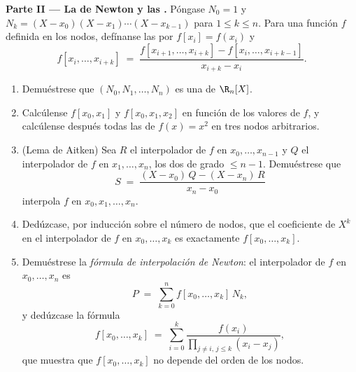 \begin{problem}
\medskip
\noindent\textbf{Parte II --- La  de Newton y las .} Póngase $N_0 = 1$ y
$N_k = (X - x_0)(X - x_1) \cdots (X - x_{k-1})$ para
$1 \leq k \leq n$. Para una función $f$ definida en los nodos,
defínanse las \emph{} por $f[x_i] = f(x_i)$ y
\[
f[x_i, \dots, x_{i+k}] \;=\;
\frac{f[x_{i+1}, \dots, x_{i+k}] - f[x_i, \dots, x_{i+k-1}]}
{x_{i+k} - x_i} .
\]
\begin{enumerate}[resume]
  \item Demuéstrese que $(N_0, N_1, \dots, N_n)$ es una  de
        $\R_n[X]$.
  \item Calcúlense $f[x_0, x_1]$ y $f[x_0, x_1, x_2]$ en función de
        los valores de $f$, y calcúlense después todas las
         de $f(x) = x^2$ en tres nodos
        arbitrarios.
  \item (Lema de Aitken) Sea $R$ el interpolador de $f$ en
        $x_0, \dots, x_{n-1}$ y $Q$ el interpolador de $f$ en
        $x_1, \dots, x_n$, los dos de grado $\leq n - 1$. Demuéstrese que
        \[
        S \;=\; \frac{(X - x_0)\,Q - (X - x_n)\,R}{x_n - x_0}
        \]
        interpola $f$ en $x_0, x_1, \dots, x_n$.
  \item Dedúzcase, por inducción sobre el número de nodos, que el
        coeficiente de $X^{k}$ en el interpolador de $f$ en
        $x_0, \dots, x_k$ es exactamente $f[x_0, \dots, x_k]$.
  \item Demuéstrese la \emph{fórmula de interpolación de Newton}: el
        interpolador de $f$ en $x_0, \dots, x_n$ es
        \[
        P \;=\; \sum_{k=0}^{n} f[x_0, \dots, x_k]\, N_k ,
        \]
        y dedúzcase la fórmula 
        \[
        f[x_0, \dots, x_k] \;=\; \sum_{i=0}^{k}
        \frac{f(x_i)}{\prod_{j \neq i,\, j \leq k} (x_i - x_j)} ,
        \]
        que muestra que $f[x_0, \dots, x_k]$ no depende del orden de
        los nodos.
\end{enumerate}


\end{problem}
